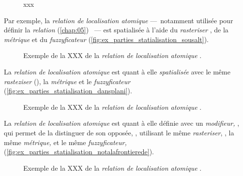 
\begin{figure}
  \centering
  
  \caption{xxx}
  \label{fig:structure_spatialisation_ontologie}
\end{figure}

Par exemple, la \emph{relation de localisation atomique}  ---~notamment utilisée pour définir la \emph{relation}  (\autoref{chap:05}) ~--- est spatialisée à l'aide du \emph{rasteriser} , de la \emph{métrique}  et du \emph{fuzzyficateur}  (\autoref{fig:ex_parties_statialisation_sousalt}).

\begin{figure}
  \centering
  
  \caption{Exemple de la XXX de la \emph{relation de localisation
      atomique} \protect{}.}
  \label{fig:ex_parties_statialisation_sousalt}
\end{figure}

La \emph{relation de localisation atomique}  est quant à elle \emph{spatialisée} avec le même \emph{rasteziser} (), la \emph{métrique}  et le \emph{fuzzyficateur}  (\autoref{fig:ex_parties_statialisation_dansplani}).

\begin{figure}
  \centering
  
  \caption{Exemple de la XXX de la \emph{relation de localisation
      atomique} \protect{}.}
  \label{fig:ex_parties_statialisation_dansplani}
\end{figure}

La \emph{relation de localisation atomique}  est quant à elle définie avec un \emph{modifieur,} , qui permet de la distinguer de son opposée, , utilisant le même \emph{rasteriser}, , la même \emph{métrique,}  et le même \emph{fuzzyficateur,}  (\autoref{fig:ex_parties_statialisation_notalafrontierede}).

\begin{figure}
  \centering
  
  \caption{Exemple de la XXX de la \emph{relation de localisation
      atomique} \protect{}.}
  \label{fig:ex_parties_statialisation_notalafrontierede}
\end{figure}

